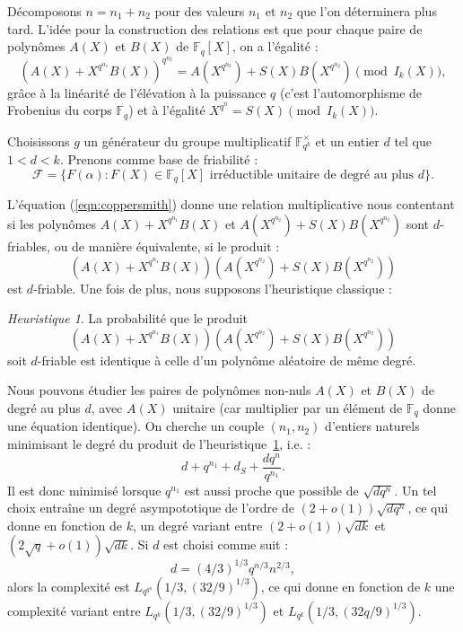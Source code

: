 \documentclass[a4paper, titlepage, 11pt]{article}
\theoremstyle{definition}
\theoremstyle{remark}
\newtheorem{heur}[theo]{Heuristique}
\def\o{o}
\def\gf #1{\mathbb{F}_{#1}}
\begin{document}
Décomposons $n = n_1 + n_2$ pour des valeurs $n_1$ et $n_2$ que l'on déterminera plus tard. L'idée pour la construction des relations est que pour chaque paire de polynômes $A(X)$ et $B(X)$ de $\gf{q}[X]$, on a l'égalité :
\begin{equation}\label{eqn:coppersmith}
{\left( A(X) + X^{q^{n_1}}B(X)\right)}^{q^{n_2}} = A(X^{q^{n_2}}) + S(X)B(X^{q^{n_2}}) \pmod{I_k(X)},
\end{equation}
grâce à la linéarité de l'élévation à la puissance $q$ (c'est l'automorphisme de Frobenius du corps $\gf{q}$) et à l'égalité $X^{q^n} = S(X) \pmod{I_k(X)}$.

Choisissons $g$ un générateur du groupe multiplicatif $\gf{q^k}^\times$ et un entier $d$ tel que $1 < d < k$. Prenons comme base de friabilité :
$$\mathcal{F} =  \{F(\alpha) : F(X) \in \gf{q}[X] \text{ irréductible unitaire de degré au plus } d \}.$$

L'équation (\ref{eqn:coppersmith}) donne une relation multiplicative nous contentant si les polynômes $A(X) + X^{q^{n_1}}B(X)$ et $A(X^{q^{n_2}}) + S(X)B(X^{q^{n_2}})$ sont $d$-friables, ou de manière équivalente, si le produit :
$$\left( A(X) + X^{q^{n_1}}B(X)\right)\left( A(X^{q^{n_2}}) + S(X)B(X^{q^{n_2}})\right)$$
est $d$-friable. Une fois de plus, nous supposons l'heuristique classique :
\begin{heur}\label{heur:polydfriable}
La probabilité que le produit $$\left( A(X) + X^{q^{n_1}}B(X)\right)\left( A(X^{q^{n_2}}) + S(X)B(X^{q^{n_2}})\right)$$ soit $d$-friable est identique à celle d'un polynôme aléatoire de même degré.
\end{heur}

Nous pouvons étudier les paires de polynômes non-nuls $A(X)$ et $B(X)$ de degré au plus $d$, avec $A(X)$ unitaire (car multiplier par un élément de $\gf{q}$ donne une équation identique). On cherche un couple $(n_1, n_2)$ d'entiers naturels minimisant le degré du produit de l'heuristique~\ref{heur:polydfriable}, i.e. :
$$d + q^{n_1} + d_S + \frac{dq^n}{q^{n_1}}.$$
Il est donc minimisé lorsque $q^{n_1}$ est aussi proche que possible de $\sqrt{dq^n}$. Un tel choix entraîne un degré asympototique de l'ordre de $(2+\o(1))\sqrt{dq^n}$, ce qui donne en fonction de $k$, un degré variant entre $(2+\o(1))\sqrt{dk}$ et $(2\sqrt{q}+\o(1))\sqrt{dk}$.
Si $d$ est choisi comme suit :
$$d = (4/3)^{1/3}q^{n/3}n^{2/3},$$
alors la complexité est $L_{q^{q^n}}(1/3, (32/9)^{1/3})$, ce qui donne en fonction de $k$ une complexité variant entre $L_{q^k}(1/3, (32/9)^{1/3})$ et $L_{q^k}(1/3, (32q/9)^{1/3})$.
\end{document}
